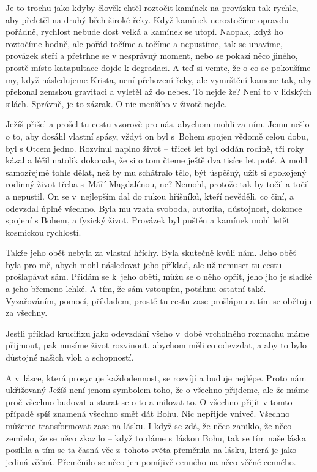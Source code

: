 Je to trochu jako kdyby člověk chtěl roztočit kamínek na provázku tak rychle, aby přeletěl na druhý břeh široké řeky. Když kamínek neroztočíme opravdu pořádně, rychlost nebude dost velká a kamínek se utopí. Naopak, když ho roztočíme hodně, ale pořád točíme a točíme a nepustíme, tak se unavíme, provázek steří a přetrhne se v nesprávný moment, nebo se pokazí něco jiného, prostě místo katapultace dojde k degradaci. A teď si vemte, že o co se pokoušíme my, když následujeme Krista, není přehození řeky, ale vymrštění kamene tak, aby překonal zemskou gravitaci a vyletěl až do nebes. To nejde že? Není to v lidských silách. Správně, je to zázrak. O nic menšího v životě nejde.

Ježíš přišel a prošel tu cestu vzorově pro nás, abychom mohli za ním. Jemu nešlo
o to, aby dosáhl vlastní spásy, vždyť on byl s~Bohem spojen vědomě celou dobu,
byl s Otcem jedno. Rozvinul naplno život -- třicet let byl oddán rodině, tři
roky kázal a léčil natolik dokonale, že si o tom čteme ještě dva tisíce let
poté. A mohl samozřejmě tohle dělat, než by mu schátralo tělo, být úspěšný, užít
si spokojený rodinný život třeba s~Máří Magdalénou, ne? Nemohl, protože tak by točil a točil a nepustil. On se v~nejlepším dal do rukou hříšníků, kteří nevěděli, co činí, a odevzdal úplně všechno. Byla mu vzata svoboda, autorita, důstojnost, dokonce spojení s Bohem, a fyzický život. Provázek byl puštěn a kamínek mohl letět kosmickou rychlostí.

Takže jeho oběť nebyla za vlastní hříchy. Byla skutečně kvůli nám. Jeho oběť byla pro mě, abych mohl následovat jeho příklad, ale už nemuset tu cestu prošlapávat sám. Přidám se k~jeho oběti, můžu se o něho opřít, jeho jho je sladké a jeho břemeno lehké. A tím, že sám vstoupím, potáhnu ostatní také. Vyzařováním, pomocí, příkladem, prostě tu cestu zase prošlápnu a tím se obětuju za všechny.

Jestli příklad krucifixu jako odevzdání všeho v~době vrcholného rozmachu máme
přijmout, pak musíme život rozvinout, abychom měli co odevzdat, a aby to bylo důstojné našich vloh a schopností.

A v~lásce, která prosycuje každodennost, se rozvíjí a buduje nejlépe. Proto nám
ukřižovaný Ježíš není jenom symbolem toho, že o všechno přijdeme, ale že máme proč všechno budovat a starat se o to a milovat to. O všechno přijít v tomto případě spíš znamená všechno smět dát Bohu. Nic nepřijde vniveč. Všechno můžeme transformovat zase na lásku. I když se zdá, že něco zaniklo, že něco zemřelo, že se něco zkazilo – když to dáme s~láskou Bohu, tak se tím naše láska posílila a tím se ta časná věc z~tohoto světa přeměnila na lásku, která je jako jediná věčná. Přeměnilo se něco jen pomíjivě cenného na něco věčně cenného.



